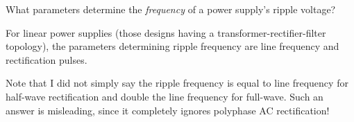 

What parameters determine the {\it frequency} of a power supply's ripple voltage?







For linear power supplies (those designs having a transformer-rectifier-filter topology), the parameters determining ripple frequency are line frequency and rectification pulses.







Note that I did not simply say the ripple frequency is equal to line frequency for half-wave rectification and double the line frequency for full-wave.  Such an answer is misleading, since it completely ignores polyphase AC rectification!




